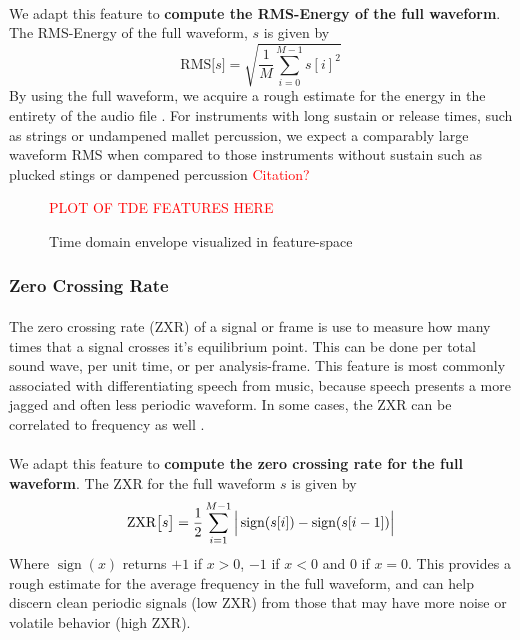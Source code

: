 \documentclass[12pt,letterpaper]{article}
\DeclareMathOperator{\sign}{\text{sign}}
\begin{document}
\paragraph*{}We adapt this feature to \textbf{compute the RMS-Energy of the full waveform}. The RMS-Energy of the full waveform, $s$ is given by \cite{Olsen,Virtanen}
\begin{equation}
\label{eqn-RMS}
\text{RMS}\big[ s \big] = \sqrt{\frac{1}{M} \sum_{i=0}^{M-1} s[i]^2}
\end{equation}
By using the full waveform, we acquire a rough estimate for the energy in the entirety of the audio file \cite{Liu}. For instruments with long sustain or release times, such as strings or undampened mallet percussion, we expect a comparably large waveform RMS when compared to those instruments without sustain such as plucked stings or dampened percussion  \textcolor{red}{Citation?}

\begin{figure}[H]
\begin{center}
\textcolor{red}{PLOT OF TDE FEATURES HERE}
\end{center}
\caption{Time domain envelope visualized in feature-space}
\label{fig-FeatureTDE}
\end{figure}


\subsubsection{Zero Crossing Rate}

\paragraph*{}The zero crossing rate (ZXR) of a signal or frame is use to measure how many times that a signal crosses it's equilibrium point. This can be done per total sound wave, per unit time, or per analysis-frame. This feature is most commonly associated with differentiating speech from music, because speech presents a more jagged and often less periodic waveform. In some cases, the ZXR can be correlated to frequency as well \cite{Kahn,Zhang}. 

\paragraph*{}We adapt this feature to \textbf{compute the zero crossing rate for the full waveform}. The ZXR for the full waveform $s$ is given by \cite{Virtanen,Liu}
\begin{equation}
\label{eqn-ZXR}
\text{ZXR}\big[ s \big] = \frac{1}{2} \sum_{i=1}^{M-1} \Big{|} \sign(s[i]) - \sign(s[i-1]) \Big{|} 
\end{equation}
Where $\sign(x)$ returns $+1$ if $x > 0$, $-1$ if $x < 0$ and $0$ if $x = 0$. This provides a rough estimate for the average frequency in the full waveform, and can help discern clean periodic signals (low ZXR) from those that may have more noise or volatile behavior (high ZXR)\cite{Virtanen}.
\end{document}
